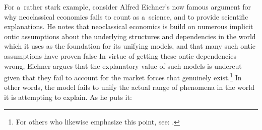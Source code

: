 For a~rather stark example, consider Alfred Eichner's now famous argument for why neoclassical economics fails to count as a~science, and to provide scientific explanations. He notes that neoclassical economics is build on numerous implicit ontic assumptions about the underlying structures and dependencies in the world which it uses as the foundation for its unifying models, and that many such ontic assumptions have proven false
 In virtue of getting these ontic dependencies wrong, Eichner argues that the explanatory value of such models is undercut given that they fail to account for the market forces that genuinely exist.\footnote{For others who likewise emphasize this point, see: 
\parencites[][]{hall_need_2001}[][]{hausman_why_2008}[][]{gills_appallingly_2022}.%
} In other words, the model fails to unify the actual range of phenomena in the world it is attempting to explain. As he puts it:

